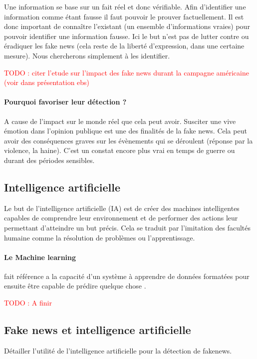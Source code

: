 \documentclass[12pt]{article}
\newcommand\todo[1]{\textcolor{red}{TODO : #1}}
\begin{document}
Une information se base sur un fait réel et donc vérifiable. Afin d'identifier une information comme étant fausse il faut pouvoir le prouver factuellement. Il est donc important de connaître l'existant (un ensemble d'informations vraies) pour pouvoir identifier une information fausse. Ici le but n'est pas de lutter contre ou éradiquer les fake news (cela reste de la liberté d'expression, dans une certaine mesure). Nous chercherons simplement à les identifier.

\todo{citer l'etude sur l'impact des fake news durant la campagne américaine (voir dans présentation ebs)}

\paragraph{Pourquoi favoriser leur détection ?} A cause de l'impact sur le monde réel que cela peut avoir. Susciter une vive émotion dans l'opinion publique est une des finalités de la fake news. Cela peut avoir des conséquences graves sur les évènements qui se déroulent (réponse par la violence, la haine). C'est un constat encore plus vrai en temps de guerre ou durant des périodes sensibles.

\subsection{Intelligence artificielle}

Le but de l'intelligence artificielle (IA) est de créer des machines intelligentes capables de comprendre leur environnement et de performer des actions leur permettant d'atteindre un but précis. Cela se traduit par l'imitation des facultés humaine comme la résolution de problèmes ou l'apprentissage.

\paragraph{Le Machine learning} fait référence a la capacité d'un système à apprendre de données formatées pour ensuite être capable de prédire quelque chose \cite{MichaelCopeland}.

\todo{A finir}

\subsection{Fake news et intelligence artificielle}

Détailler l'utilité de l'intelligence artificielle pour la détection de fakenews.
\end{document}
